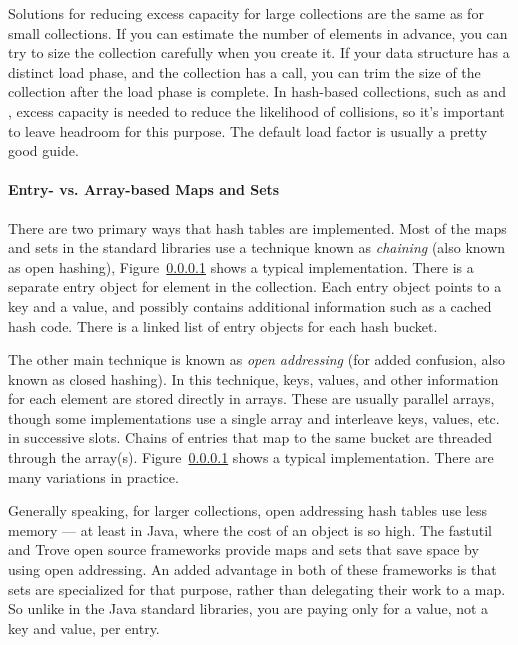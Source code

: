 Solutions for reducing excess capacity for large collections are the same as
for small collections. If you can estimate the number of elements in advance,
you can try to size the collection carefully when you create it.  If your data structure has a
distinct load phase, and the collection has a  call, you can
trim the size of the collection after the load phase is complete. In hash-based collections, such as
 and , excess capacity is needed to reduce the
likelihood of collisions, so it's important to leave headroom for this
purpose. The default load factor is usually a pretty good guide. 



\paragraph{Entry- vs. Array-based Maps and Sets}

There are two primary ways that hash tables are implemented. Most of the maps and sets
in the standard libraries use a technique known as \emph{chaining} (also
known as open hashing), Figure~\ref{} shows a typical
implementation. There is a separate entry object for element in the collection.
Each entry object points to a key and a value, and possibly contains
additional information such as a cached hash code. There is a linked list of
entry objects for each hash bucket.

The other main technique is known as \emph{open addressing} (for added
confusion, also known as closed hashing).  In this technique,
keys, values, and other information for each element are stored directly in
arrays. These are usually parallel arrays, though some implementations
use a single array and interleave keys, values, etc. in successive slots. Chains
of entries that map to the same bucket are threaded through the array(s).
Figure~\ref{} shows a typical implementation. There are many variations in
practice.

Generally speaking, for larger collections, open addressing hash tables use less
memory --- at least in Java, where the cost of an object is so high. The fastutil and Trove open source
frameworks provide maps and sets that save space by using open addressing. An added
advantage in both of these frameworks is that sets are specialized for
that purpose, rather than delegating their work to a map. So unlike in the Java standard libraries,
you are paying only for a value, not a key and value, per entry. 

